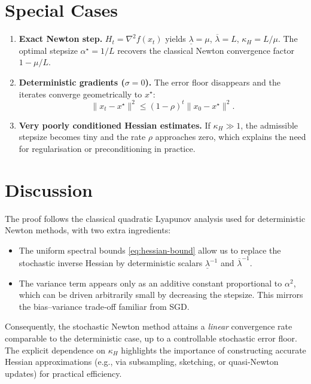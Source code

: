 \documentclass{article}
\begin{document}
\section*{Special Cases}
\begin{enumerate}
\item \textbf{Exact Newton step.} $H_{t}=\nabla^{2}f(x_{t})$ yields $\underline{\lambda}=\mu$, $\overline{\lambda}=L$, $\kappa_{H}=L/\mu$. The optimal stepsize $\alpha^{\star}=1/L$ recovers the classical Newton convergence factor $1-\mu/L$.

\item \textbf{Deterministic gradients ($\sigma=0$).} The error floor disappears and the iterates converge geometrically to $x^{\star}$:
\[
\|x_{t}-x^{\star}\|^{2}\le (1-\rho)^{t}\|x_{0}-x^{\star}\|^{2}.
\]

\item \textbf{Very poorly conditioned Hessian estimates.} If $\kappa_{H}\gg 1$, the admissible stepsize becomes tiny and the rate $\rho$ approaches zero, which explains the need for regularisation or preconditioning in practice.

\end{enumerate}

\section*{Discussion}
The proof follows the classical quadratic Lyapunov analysis used for deterministic Newton methods, with two extra ingredients:
\begin{itemize}
\item The uniform spectral bounds \eqref{eq:hessian-bound} allow us to replace the stochastic inverse Hessian by deterministic scalars $\underline{\lambda}^{-1}$ and $\overline{\lambda}^{-1}$.
\item The variance term appears only as an additive constant proportional to $\alpha^{2}$, which can be driven arbitrarily small by decreasing the stepsize. This mirrors the bias–variance trade‑off familiar from SGD.
\end{itemize}
Consequently, the stochastic Newton method attains a \emph{linear} convergence rate comparable to the deterministic case, up to a controllable stochastic error floor. The explicit dependence on $\kappa_{H}$ highlights the importance of constructing accurate Hessian approximations (e.g., via subsampling, sketching, or quasi‑Newton updates) for practical efficiency.
\end{document}
